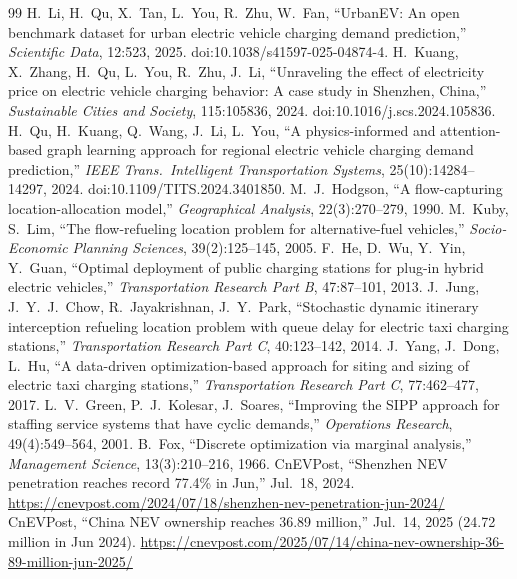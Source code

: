 \documentclass[11pt,a4paper]{article}
\begin{document}
\begin{thebibliography}{99}\small
{} H.~Li, H.~Qu, X.~Tan, L.~You, R.~Zhu, W.~Fan, ``UrbanEV: An open benchmark dataset for urban electric vehicle charging demand prediction,'' \emph{Scientific Data}, 12:523, 2025. doi:10.1038/s41597-025-04874-4.
 H.~Kuang, X.~Zhang, H.~Qu, L.~You, R.~Zhu, J.~Li, ``Unraveling the effect of electricity price on electric vehicle charging behavior: A case study in Shenzhen, China,'' \emph{Sustainable Cities and Society}, 115:105836, 2024. doi:10.1016/j.scs.2024.105836.
 H.~Qu, H.~Kuang, Q.~Wang, J.~Li, L.~You, ``A physics-informed and attention-based graph learning approach for regional electric vehicle charging demand prediction,'' \emph{IEEE Trans.\ Intelligent Transportation Systems}, 25(10):14284--14297, 2024. doi:10.1109/TITS.2024.3401850.
 M.~J.~Hodgson, ``A flow-capturing location-allocation model,'' \emph{Geographical Analysis}, 22(3):270--279, 1990.
 M.~Kuby, S.~Lim, ``The flow-refueling location problem for alternative-fuel vehicles,'' \emph{Socio-Economic Planning Sciences}, 39(2):125--145, 2005.
 F.~He, D.~Wu, Y.~Yin, Y.~Guan, ``Optimal deployment of public charging stations for plug-in hybrid electric vehicles,'' \emph{Transportation Research Part B}, 47:87--101, 2013.
 J.~Jung, J.~Y.~J.~Chow, R.~Jayakrishnan, J.~Y.~Park, ``Stochastic dynamic itinerary interception refueling location problem with queue delay for electric taxi charging stations,'' \emph{Transportation Research Part C}, 40:123--142, 2014.
 J.~Yang, J.~Dong, L.~Hu, ``A data-driven optimization-based approach for siting and sizing of electric taxi charging stations,'' \emph{Transportation Research Part C}, 77:462--477, 2017.
 L.~V.~Green, P.~J.~Kolesar, J.~Soares, ``Improving the SIPP approach for staffing service systems that have cyclic demands,'' \emph{Operations Research}, 49(4):549--564, 2001.
 B.~Fox, ``Discrete optimization via marginal analysis,'' \emph{Management Science}, 13(3):210--216, 1966.
 CnEVPost, ``Shenzhen NEV penetration reaches record 77.4\% in Jun,'' Jul.~18, 2024. \url{https://cnevpost.com/2024/07/18/shenzhen-nev-penetration-jun-2024/}
 CnEVPost, ``China NEV ownership reaches 36.89 million,'' Jul.~14, 2025 (24.72 million in Jun 2024). \url{https://cnevpost.com/2025/07/14/china-nev-ownership-36-89-million-jun-2025/}
\end{thebibliography}
\end{document}
